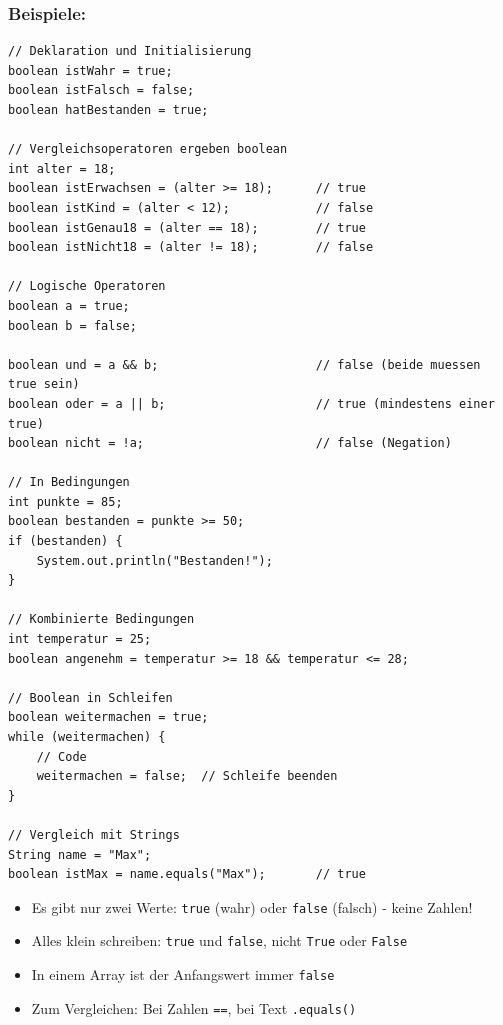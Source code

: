 \subsubsection*{Beispiele:}
\begin{lstlisting}
// Deklaration und Initialisierung
boolean istWahr = true;
boolean istFalsch = false;
boolean hatBestanden = true;

// Vergleichsoperatoren ergeben boolean
int alter = 18;
boolean istErwachsen = (alter >= 18);      // true
boolean istKind = (alter < 12);            // false
boolean istGenau18 = (alter == 18);        // true
boolean istNicht18 = (alter != 18);        // false

// Logische Operatoren
boolean a = true;
boolean b = false;

boolean und = a && b;                      // false (beide muessen true sein)
boolean oder = a || b;                     // true (mindestens einer true)
boolean nicht = !a;                        // false (Negation)

// In Bedingungen
int punkte = 85;
boolean bestanden = punkte >= 50;
if (bestanden) {
    System.out.println("Bestanden!");
}

// Kombinierte Bedingungen
int temperatur = 25;
boolean angenehm = temperatur >= 18 && temperatur <= 28;

// Boolean in Schleifen
boolean weitermachen = true;
while (weitermachen) {
    // Code
    weitermachen = false;  // Schleife beenden
}

// Vergleich mit Strings
String name = "Max";
boolean istMax = name.equals("Max");       // true
\end{lstlisting}

\begin{achtung}
	\begin{itemize}
		\item Es gibt nur zwei Werte: \texttt{true} (wahr) oder \texttt{false} (falsch) - keine Zahlen!
		\item Alles klein schreiben: \texttt{true} und \texttt{false}, nicht \texttt{True} oder \texttt{False}
		\item In einem Array ist der Anfangswert immer \texttt{false}
		\item Zum Vergleichen: Bei Zahlen \texttt{==}, bei Text \texttt{.equals()}
	\end{itemize}
\end{achtung}

\newpage


